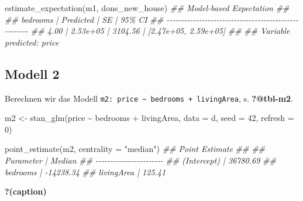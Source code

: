 \documentclass[
  a4paper,
  DIV=11]{scrreprt}
\newenvironment{Shaded}{\begin{snugshade}}{\end{snugshade}}
\newcommand{\AttributeTok}[1]{\textcolor[rgb]{0.40,0.45,0.13}{#1}}
\newcommand{\DecValTok}[1]{\textcolor[rgb]{0.68,0.00,0.00}{#1}}
\newcommand{\DocumentationTok}[1]{\textcolor[rgb]{0.37,0.37,0.37}{\textit{#1}}}
\newcommand{\FunctionTok}[1]{\textcolor[rgb]{0.28,0.35,0.67}{#1}}
\newcommand{\NormalTok}[1]{\textcolor[rgb]{0.00,0.23,0.31}{#1}}
\newcommand{\OtherTok}[1]{\textcolor[rgb]{0.00,0.23,0.31}{#1}}
\newcommand{\SpecialCharTok}[1]{\textcolor[rgb]{0.37,0.37,0.37}{#1}}
\newcommand{\StringTok}[1]{\textcolor[rgb]{0.13,0.47,0.30}{#1}}
\theoremstyle{definition}
\theoremstyle{remark}
\begin{document}
\begin{Shaded}
\begin{Highlighting}[]
\FunctionTok{estimate\_expectation}\NormalTok{(m1, dons\_new\_house)}
\DocumentationTok{\#\# Model{-}based Expectation}
\DocumentationTok{\#\# }
\DocumentationTok{\#\# bedrooms | Predicted |      SE |               95\% CI}
\DocumentationTok{\#\# {-}{-}{-}{-}{-}{-}{-}{-}{-}{-}{-}{-}{-}{-}{-}{-}{-}{-}{-}{-}{-}{-}{-}{-}{-}{-}{-}{-}{-}{-}{-}{-}{-}{-}{-}{-}{-}{-}{-}{-}{-}{-}{-}{-}{-}{-}{-}{-}{-}{-}{-}{-}{-}}
\DocumentationTok{\#\# 4.00     |  2.53e+05 | 3104.56 | [2.47e+05, 2.59e+05]}
\DocumentationTok{\#\# }
\DocumentationTok{\#\# Variable predicted: price}
\end{Highlighting}
\end{Shaded}

\hypertarget{modell-2}{%
\subsection{Modell 2}\label{modell-2}}

Berechnen wir das Modell
\texttt{m2:\ price\ \textasciitilde{}\ bedrooms\ +\ livingArea}, s.
\textbf{?@tbl-m2}.

\begin{Shaded}
\begin{Highlighting}[]
\NormalTok{m2 }\OtherTok{\textless{}{-}} \FunctionTok{stan\_glm}\NormalTok{(price }\SpecialCharTok{\textasciitilde{}}\NormalTok{ bedrooms }\SpecialCharTok{+}\NormalTok{ livingArea, }
               \AttributeTok{data =}\NormalTok{ d, }
               \AttributeTok{seed =} \DecValTok{42}\NormalTok{,}
               \AttributeTok{refresh =} \DecValTok{0}\NormalTok{)}

\FunctionTok{point\_estimate}\NormalTok{(m2, }\AttributeTok{centrality =} \StringTok{"median"}\NormalTok{)}
\DocumentationTok{\#\# Point Estimate}
\DocumentationTok{\#\# }
\DocumentationTok{\#\# Parameter   |    Median}
\DocumentationTok{\#\# {-}{-}{-}{-}{-}{-}{-}{-}{-}{-}{-}{-}{-}{-}{-}{-}{-}{-}{-}{-}{-}{-}{-}}
\DocumentationTok{\#\# (Intercept) |  36780.69}
\DocumentationTok{\#\# bedrooms    | {-}14238.34}
\DocumentationTok{\#\# livingArea  |    125.41}
\end{Highlighting}
\end{Shaded}

\begin{table}

\caption{\textbf{?(caption)}}

\end{table}
\end{document}
